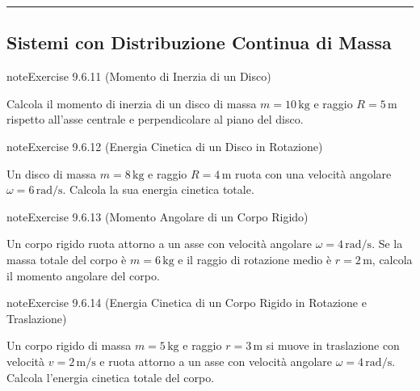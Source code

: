 \documentclass[letterpaper,10pt,italian]{jupyterBook}
\begin{document}
\bigskip\hrule\bigskip



\subsection{Sistemi con Distribuzione Continua di Massa}
\label{\detokenize{ch/mechanics/inertia-problems:sistemi-con-distribuzione-continua-di-massa}} \label{exercise:ch/mechanics/inertia-problems-exercise-10}

\begin{sphinxadmonition}{note}{Exercise 9.6.11 (Momento di Inerzia di un Disco)}



\sphinxAtStartPar
Calcola il momento di inerzia di un disco di massa \(m = 10 \, \text{kg}\) e raggio \(R = 5 \, \text{m}\) rispetto all’asse centrale e perpendicolare al piano del disco.
\end{sphinxadmonition}
 \label{exercise:ch/mechanics/inertia-problems-exercise-11}

\begin{sphinxadmonition}{note}{Exercise 9.6.12 (Energia Cinetica di un Disco in Rotazione)}



\sphinxAtStartPar
Un disco di massa \(m = 8 \, \text{kg}\) e raggio \(R = 4 \, \text{m}\) ruota con una velocità angolare \(\omega = 6 \, \text{rad/s}\). Calcola la sua energia cinetica totale.
\end{sphinxadmonition}
 \label{exercise:ch/mechanics/inertia-problems-exercise-12}

\begin{sphinxadmonition}{note}{Exercise 9.6.13 (Momento Angolare di un Corpo Rigido)}



\sphinxAtStartPar
Un corpo rigido ruota attorno a un asse con velocità angolare \(\omega = 4 \, \text{rad/s}\). Se la massa totale del corpo è \(m = 6 \, \text{kg}\) e il raggio di rotazione medio è \(r = 2 \, \text{m}\), calcola il momento angolare del corpo.
\end{sphinxadmonition}
 \label{exercise:ch/mechanics/inertia-problems-exercise-13}

\begin{sphinxadmonition}{note}{Exercise 9.6.14 (Energia Cinetica di un Corpo Rigido in Rotazione e Traslazione)}



\sphinxAtStartPar
Un corpo rigido di massa \(m = 5 \, \text{kg}\) e raggio \(r = 3 \, \text{m}\) si muove in traslazione con velocità \(v = 2 \, \text{m/s}\) e ruota attorno a un asse con velocità angolare \(\omega = 4 \, \text{rad/s}\). Calcola l’energia cinetica totale del corpo.
\end{sphinxadmonition}
 \label{exercise:ch/mechanics/inertia-problems-exercise-14}
\end{document}
